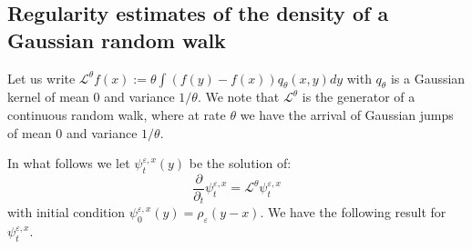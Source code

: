 \documentclass[a4paper,12pt]{article}
\newcommand{\1}{{\bf {1}}}
\def\epsilon{\varepsilon}
\begin{document}
\subsection{Regularity estimates of the density of a Gaussian random walk}
Let us write $\mathcal{L}^\theta f(x) := \theta \int (f(y)-f(x))q_\theta(x,y) dy$ with $q_\theta$ is a Gaussian kernel of mean $0$ and variance $1/\theta$. We note that $\mathcal{L}^\theta$ is the generator of a continuous random walk, where at rate $\theta$ we have the arrival of Gaussian jumps of mean $0$ and variance $1/\theta$.

In what follows we let $\psi_t^{\epsilon, x}(y)$ be the solution of:
\begin{equation} \frac{\partial}{ \partial_t} \psi_t^{\epsilon,x} = \mathcal{L}^\theta \psi_t^{\epsilon, x} \label{AlmostHeatEquation} \end{equation}
with initial condition $\psi_0^{\epsilon,x}(y) = \rho_\epsilon(y-x)$. We have the following result for $\psi_t^{\epsilon,x}$.
\end{document}
